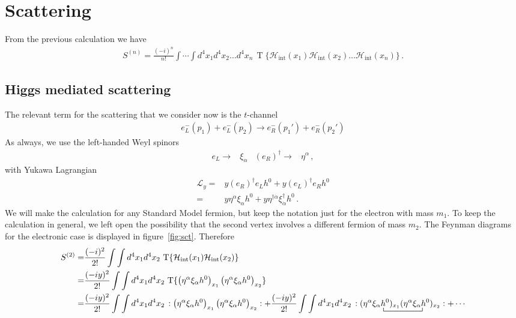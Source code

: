 \section{Scattering}
\label{sec:scattering}
From the previous calculation we have
\begin{align}
S^{(n)}=  \frac{(-i)^n}{n!}\int\cdots\int d^4x_1 d^4x_2\ldots d^4x_n\,\operatorname{T}\{\mathcal{H}_{\text{int}}(x_1)\mathcal{H}_{\text{int}}(x_2)\ldots\mathcal{H}_{\text{int}}(x_n)\}\,.
\end{align}

\subsection{Higgs mediated scattering}
\label{sec:higgs-medi-scatt}

The relevant term for the scattering that we consider now is the $t$-channel
\begin{align}
  e^{-}_L(p_1)+e_L^{-}(p_2)\to   e_R^{-}(p_1')+e_R^{-}(p_2')
\end{align}
As always, we use the left-handed Weyl spinors
\begin{align}
  e_L\to &\xi_{\alpha} &   \left( e_R \right)^{\dagger}\to &\eta^{\alpha}\,,
\end{align}
with Yukawa Lagrangian
\begin{align}
  \mathcal{L}_y=& y \left(e_R\right)^{\dagger} e_L h^0 +y \left(e_L\right)^{\dagger} e_R h^0 \nonumber\\
               =& y \eta^{\alpha} \xi_{\alpha}h^0 + y \eta^{\dagger\dot{\alpha}} \xi_{\dot{\alpha}}^{\dagger}h^0\,. 
\end{align}
We will make the calculation for any Standard Model fermion, but keep the notation just for the electron with mass $m_1$. To keep the calculation in general, we left open the possibility that the second vertex involves a different fermion of mass $m_2$. The Feynman diagrams for the electronic case is displayed in figure~\ref{fig:sct}. Therefore
\begin{align}
S^{(2)}=&  \frac{(-i)^2}{2!}\int\int d^4x_1 d^4x_2\,\operatorname{T}\{\mathcal{H}_{\text{int}}(x_1)\mathcal{H}_{\text{int}}(x_2)\}\nonumber\\
=&  \frac{(-iy)^2}{2!}\int\int d^4x_1 d^4x_2\,\operatorname{T}\{\left( \eta^{\alpha} \xi_{\alpha}h^0 \right)_{x_1} \left( \eta^{\alpha} \xi_{\alpha}h^0 \right)_{x_2}\}\nonumber\\
=& 
 \frac{(-iy)^2}{2!}\int\int d^4x_1 d^4x_2\,:\left( \eta^{\alpha} \xi_{\alpha}h^0 \right)_{x_1} \left( \eta^{\alpha} \xi_{\alpha}h^0 \right)_{x_2}:+
 \frac{(-iy)^2}{2!}\int\int d^4x_1 d^4x_2\,:( \eta^{\alpha} 
\bcontraction{\xi_{\alpha}}{\phi}{)_{x_1}(\eta^{\alpha} \xi_{\alpha}}{h^0}
\xi_{\alpha} h^0)_{x_1}(\eta^{\alpha} \xi_{\alpha}h^0 
)_{x_2}:+\cdots
\end{align}
